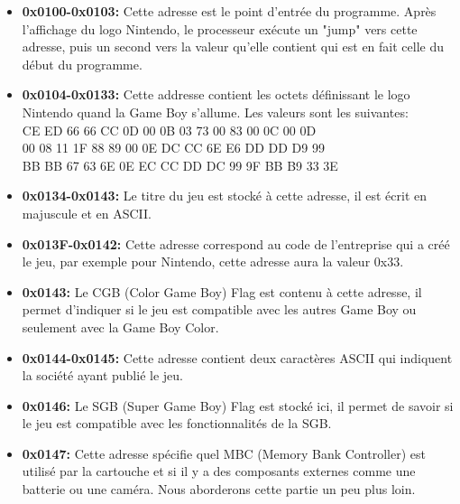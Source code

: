 \documentclass{report}
\begin{document}
\begin{itemize}

\item \textbf{0x0100-0x0103:} Cette adresse est le point d'entrée du programme. Après l'affichage du logo Nintendo, le processeur exécute un "jump" vers cette adresse, puis un second vers la valeur qu'elle contient qui est en fait celle du début du programme.\\

\item \textbf{0x0104-0x0133:} Cette addresse contient les octets définissant le logo Nintendo quand la Game Boy s'allume. Les valeurs sont les suivantes:
\\CE ED 66 66 CC 0D 00 0B 03 73 00 83 00 0C 00 0D
\\00 08 11 1F 88 89 00 0E DC CC 6E E6 DD DD D9 99
\\BB BB 67 63 6E 0E EC CC DD DC 99 9F BB B9 33 3E\\

\item \textbf{0x0134-0x0143:} Le titre du jeu est stocké à cette adresse, il est écrit en majuscule et en ASCII.\\

\item \textbf{0x013F-0x0142:} Cette adresse correspond au code de l'entreprise qui a créé le jeu, par exemple pour Nintendo, cette adresse aura la valeur 0x33.\\

\item \textbf{0x0143:} Le CGB (Color Game Boy) Flag est contenu à cette adresse, il permet d'indiquer si le jeu est compatible avec les autres Game Boy ou seulement avec la Game Boy Color.\\

\item \textbf{0x0144-0x0145:} Cette adresse contient deux caractères ASCII qui indiquent la société ayant publié le jeu.\\

\item \textbf{0x0146:} Le SGB (Super Game Boy) Flag est stocké ici, il permet de savoir si le jeu est compatible avec les fonctionnalités de la SGB.\\

\item \textbf{0x0147:} Cette adresse spécifie quel MBC (Memory Bank Controller) est utilisé par la cartouche et si il y a des composants externes comme une batterie ou une caméra. Nous aborderons cette partie un peu plus loin.\\


\end{itemize}
\end{document}
